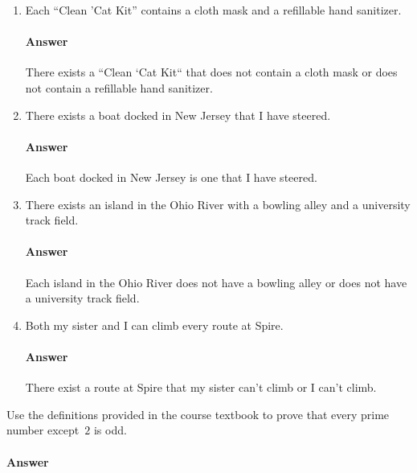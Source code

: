 \documentclass{article}
\begin{document}
\begin{enumerate}

    \item Each ``Clean 'Cat Kit''  contains a cloth mask and a refillable hand
        sanitizer.

        \paragraph{Answer}
        There exists a ``Clean `Cat Kit`` that does not contain a cloth mask or does not contain a refillable hand sanitizer.

    \item There exists a boat docked in New Jersey that I have steered.

        \paragraph{Answer}
        Each boat docked in New Jersey is one that I have steered.

    \item There exists an island in the Ohio River with a bowling alley and a
        university track field.

        \paragraph{Answer}
        Each island in the Ohio River does not have a bowling alley or does not have a university track field.

    \item Both my sister and I can climb every route at Spire.

        \paragraph{Answer}
        There exist a route at Spire that my sister can't climb or I can't climb.

\end{enumerate}

 
Use the definitions provided in the course textbook to prove that every prime
number except~$2$ is odd.

\paragraph{Answer}
\end{document}
